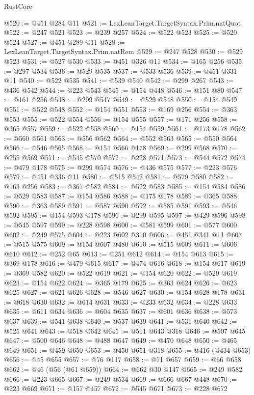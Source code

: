 \begin{lexlean}{RustCore}
\begin{coremodule}
@520 := @451 @284 @11
@521 := LexLeanTarget.TargetSyntax.Prim.natQuot
@522 := @247 @521
@523 := @239 @257
@524 := @522 @523
@525 := @520 @524
@527 := @451 @289 @11
@528 := LexLeanTarget.TargetSyntax.Prim.natRem
@529 := @247 @528
@530 := @529 @523
@531 := @527 @530
@533 := @451 @326 @11
@534 := @165 @256
@535 := @297 @534
@536 := @529 @535
@537 := @533 @536
@539 := @451 @331 @11
@540 := @522 @535
@541 := @539 @540
@542 := @299 @267
@543 := @436 @542
@544 := @223 @543
@545 := @154 @448
@546 := @151 @80
@547 := @161 @256
@548 := @299 @547
@549 := @529 @548
@550 := @154 @549
@551 := @522 @548
@552 := @154 @551
@553 := @169 @256
@554 := @363 @553
@555 := @522 @554
@556 := @154 @555
@557 := @171 @256
@558 := @365 @557
@559 := @522 @558
@560 := @154 @559
@561 := @173 @178
@562 := @560 @561
@563 := @556 @562
@564 := @552 @563
@565 := @550 @564
@566 := @546 @565
@568 := @154 @566 @178
@569 := @299 @568
@570 := @255 @569
@571 := @545 @570
@572 := @228 @571
@573 := @544 @572
@574 := @479 @178
@575 := @299 @574
@576 := @436 @575
@577 := @223 @576
@579 := @451 @336 @11
@580 := @515 @542
@581 := @579 @580
@582 := @163 @256
@583 := @367 @582
@584 := @522 @583
@585 := @154 @584
@586 := @529 @583
@587 := @154 @586
@588 := @175 @178
@589 := @365 @588
@590 := @363 @589
@591 := @587 @590
@592 := @585 @591
@593 := @546 @592
@595 := @154 @593 @178
@596 := @299 @595
@597 := @429 @596
@598 := @545 @597
@599 := @228 @598
@600 := @581 @599
@601 := @577 @600
@602 := @249 @575
@604 := @223 @602 @310
@606 := @451 @341 @11
@607 := @515 @575
@609 := @154 @607 @480
@610 := @515 @609
@611 := @606 @610
@612 := @252 @65
@613 := @251 @612
@614 := @154 @613
@615 := @369 @178
@616 := @479 @615
@617 := @474 @616
@618 := @154 @617
@619 := @369 @582
@620 := @522 @619
@621 := @154 @620
@622 := @529 @619
@623 := @154 @622
@624 := @365 @179
@625 := @363 @624
@626 := @623 @625
@627 := @621 @626
@628 := @546 @627
@630 := @154 @628 @178
@631 := @618 @630
@632 := @614 @631
@633 := @233 @632
@634 := @228 @633
@635 := @611 @634
@636 := @604 @635
@637 := @601 @636
@638 := @573 @637
@639 := @541 @638
@640 := @537 @639
@641 := @531 @640
@642 := @525 @641
@643 := @518 @642
@645 := @511 @643 @318
@646 := @507 @645
@647 := @500 @646
@648 := @488 @647
@649 := @470 @648
@650 := @465 @649
@651 := @459 @650
@653 := @450 @651 @318
@655 := @416 (@434 @653)
@656 := @45 @655
@657 := @76 @117
@658 := @71 @657
@659 := @66 @658
@662 := @46 (@56 (@61 @659))
@664 := @662 @30 @147
@665 := @249 @582
@666 := @223 @665
@667 := @249 @534
@669 := @666 @667 @448
@670 := @223 @669
@671 := @157 @457
@672 := @545 @671
@673 := @228 @672

\end{coremodule}
\end{lexlean}
